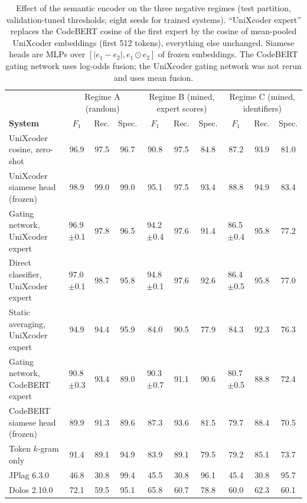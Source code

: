 \begin{table}[t]
\centering
\caption{Effect of the semantic encoder on the three negative regimes (test partition, validation-tuned thresholds; eight seeds for trained systems). ``UniXcoder expert'' replaces the CodeBERT cosine of the first expert by the cosine of mean-pooled UniXcoder embeddings (first 512 tokens), everything else unchanged. Siamese heads are MLPs over $[|e_1-e_2|, e_1\odot e_2]$ of frozen embeddings. The CodeBERT gating network uses log-odds fusion; the UniXcoder gating network was not rerun and uses mean fusion.}
\label{tab:ux}
\scriptsize
\setlength{\tabcolsep}{3pt}
\begin{tabular}{l|ccc|ccc|ccc}
\toprule
 & \multicolumn{3}{c|}{Regime A (random)} & \multicolumn{3}{c|}{Regime B (mined, expert scores)} & \multicolumn{3}{c}{Regime C (mined, identifiers)} \\
\textbf{System} & $F_1$ & Rec. & Spec. & $F_1$ & Rec. & Spec. & $F_1$ & Rec. & Spec. \\
\midrule
UniXcoder cosine, zero-shot & 96.9 & 97.5 & 96.7 & 90.8 & 97.5 & 84.8 & 87.2 & 93.9 & 81.0 \\
UniXcoder siamese head (frozen) & 98.9 & 99.0 & 99.0 & 95.1 & 97.5 & 93.4 & 88.8 & 94.9 & 83.4 \\
Gating network, UniXcoder expert & 96.9\,{\scriptsize$\pm$0.1} & 97.8 & 96.5 & 94.2\,{\scriptsize$\pm$0.4} & 97.6 & 91.4 & 86.5\,{\scriptsize$\pm$0.4} & 95.8 & 77.2 \\
Direct classifier, UniXcoder expert & 97.0\,{\scriptsize$\pm$0.1} & 98.7 & 95.8 & 94.8\,{\scriptsize$\pm$0.1} & 97.6 & 92.6 & 86.4\,{\scriptsize$\pm$0.5} & 95.8 & 77.0 \\
Static averaging, UniXcoder expert & 94.9 & 94.4 & 95.9 & 84.0 & 90.5 & 77.9 & 84.3 & 92.3 & 76.3 \\
\midrule
Gating network, CodeBERT expert & 90.8\,{\scriptsize$\pm$0.3} & 93.4 & 89.0 & 90.3\,{\scriptsize$\pm$0.7} & 91.1 & 90.6 & 80.7\,{\scriptsize$\pm$0.5} & 88.8 & 72.4 \\
CodeBERT siamese head (frozen) & 89.9 & 91.3 & 89.6 & 87.3 & 93.6 & 81.5 & 79.7 & 88.4 & 70.5 \\
Token $k$-gram only & 91.4 & 89.1 & 94.9 & 83.9 & 89.1 & 79.5 & 79.2 & 85.1 & 73.7 \\
JPlag 6.3.0 & 46.8 & 30.8 & 99.4 & 45.5 & 30.8 & 96.1 & 45.4 & 30.8 & 95.7 \\
Dolos 2.10.0 & 72.1 & 59.5 & 95.1 & 65.8 & 60.7 & 78.8 & 60.0 & 62.3 & 60.1 \\
\bottomrule
\end{tabular}
\end{table}